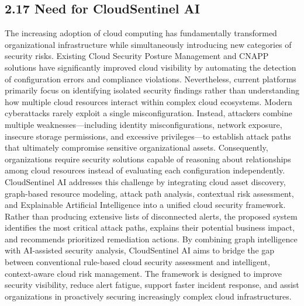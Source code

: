 \subsection{2.17 Need for CloudSentinel AI}

The increasing adoption of cloud computing has fundamentally transformed organizational infrastructure while simultaneously introducing new categories of security risks. Existing Cloud Security Posture Management and CNAPP solutions have significantly improved cloud visibility by automating the detection of configuration errors and compliance violations. Nevertheless, current platforms primarily focus on identifying isolated security findings rather than understanding how multiple cloud resources interact within complex cloud ecosystems. Modern cyberattacks rarely exploit a single misconfiguration. Instead, attackers combine multiple weaknesses---including identity misconfigurations, network exposure, insecure storage permissions, and excessive privileges---to establish attack paths that ultimately compromise sensitive organizational assets. Consequently, organizations require security solutions capable of reasoning about relationships among cloud resources instead of evaluating each configuration independently. CloudSentinel AI addresses this challenge by integrating cloud asset discovery, graph-based resource modeling, attack path analysis, contextual risk assessment, and Explainable Artificial Intelligence into a unified cloud security framework. Rather than producing extensive lists of disconnected alerts, the proposed system identifies the most critical attack paths, explains their potential business impact, and recommends prioritized remediation actions. By combining graph intelligence with AI-assisted security analysis, CloudSentinel AI aims to bridge the gap between conventional rule-based cloud security assessment and intelligent, context-aware cloud risk management. The framework is designed to improve security visibility, reduce alert fatigue, support faster incident response, and assist organizations in proactively securing increasingly complex cloud infrastructures.
